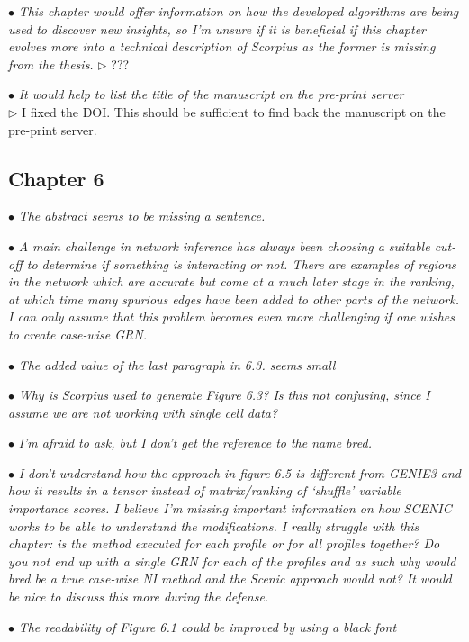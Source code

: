 \documentclass[10pt]{article}
\newcommand{\exam}[2][\  ]{\hspace{0pt}\marginpar{\color{red}#1}$\bullet$ \textit{#2}}
\newcommand{\imp}[1]{{\color{red} #1}}
\newcommand{\answ}[1]{{\color{blue} $\triangleright$ #1}}
\begin{document}
{\exam{This chapter would offer information on how the developed algorithms
	are being used to discover new insights, so I’m unsure if it is beneficial if this
	chapter evolves more into a technical description of Scorpius as the former is
	missing from the thesis.}
\answ{???}


\exam{It would help to list the title of the manuscript on the pre-print server} \\
\answ{I fixed the DOI. This should be sufficient to find back the manuscript on the pre-print server.}


\subsection{Chapter 6}

\exam{The abstract seems to be missing a sentence.}


\exam{\imp{A main challenge in network inference has always been choosing a suitable
		cut-off to determine if something is interacting or not.} There are examples of
		regions in the network which are accurate but come at a much later stage in
		the ranking, at which time many spurious edges have been added to other
		parts of the network. I can only assume that this problem becomes even more
		challenging if one wishes to create case-wise GRN.}
	

\exam{The added value of the last paragraph in 6.3. seems small}

\exam{Why is Scorpius used to generate Figure 6.3? Is this not confusing, since I
		assume we are not working with single cell data?}

\exam{I’m afraid to ask, but I don’t get the reference to the name bred.}
 

\exam{\imp{I don’t understand how the approach in figure 6.5 is different from GENIE3 and
		how it results in a tensor instead of matrix/ranking of ‘shuffle’ variable
		importance scores.} I believe I’m missing important information on how
		SCENIC works to be able to understand the modifications. I really struggle
		with this chapter: is the method executed for each profile or for all profiles
		together? Do you not end up with a single GRN for each of the profiles and as
		such why would bred be a true case-wise NI method and the Scenic approach
		would not? It would be nice to discuss this more during the defense.}


\exam{The readability of Figure 6.1 could be improved by using a black font}
 



}
\end{document}
